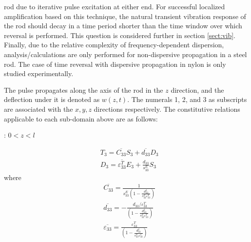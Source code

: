 \documentclass[11pt,letterpaper]{article}%
\begin{document}
rod due to iterative pulse excitation at either end.  For
successful localized amplification based on this technique, the
natural transient vibration response of the rod should decay in a
time period shorter than the time window over which reversal is
performed.  This question is considered further in section
\ref{sect:vib}.  Finally, due to the relative complexity of
frequency-dependent dispersion, analysis/calculations are only
performed for non-dispersive propagation in a steel rod.  The case
of time reversal with dispersive propagation in nylon is only
studied experimentally.

The pulse propagates along the axis of the rod in the $z$
direction, and the deflection under it is denoted as $w(z,t)$.
The numerals 1, 2, and 3 as subscripts are associated with the $x,
y, z$ directions respectively. The constitutive relations
applicable to each sub-domain above are as follows:

: $0<z<l$

\begin{align}%
&T_3 = \overline{{C_{33}}}S_3 + \overline{d_{33}}D_3 \nonumber\\
&D_3 = \overline{{\varepsilon}^T_{33}}E_3 +
\frac{d_{33}}{s^E_{33}}S_3 \label{constitsend1}
\end{align}%
%
%
%
%
%
%
%
%
%
%
%
%
where
\begin{align}%
&\overline{C_{33}} =
\frac{1}{s^E_{33}\left(1-\frac{d^2_{33}}{s^E_{33}\varepsilon^T_{33}}\right)}
\nonumber\\
&\overline{d_{33}} =
-\frac{d_{33}/\varepsilon^T_{33}}{\left(1-\frac{d^2_{33}}{s^E_{33}\varepsilon^T_{33}}\right)}\nonumber\\
&\overline{\varepsilon_{33}} =
\frac{\varepsilon^T_{33}}{\left(1-\frac{d^2_{33}}{s^E_{33}\varepsilon^T_{33}}\right)}
\label{constinv1}
\end{align}
%
\end{document}
